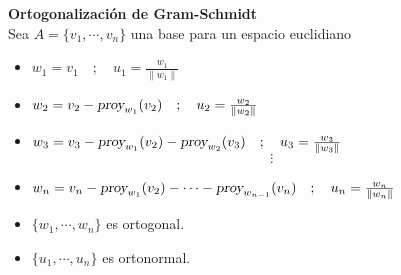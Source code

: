 \begin{defi}\textbf{Ortogonalización de Gram-Schmidt}
    \\
    Sea $A = \{ {v}_{1}, \cdots , {v}_{n} \}$ una base para un espacio euclidiano
    \begin{itemize}
        \item ${w}_{1} = {v}_{1} \quad ; \quad {u}_{1} = \frac{{w}_{1}}{\|{w}_{1} \|}$
        \item ${w}_{2} = {v}_{2} - {\textsl{proy}}_{{w}_{1}}({v}_{2}) \quad ; \quad {u}_{2} = \frac{{w}_{2}}{\|{w}_{2} \|}$
        \item ${w}_{3} = {v}_{3} - {\textsl{proy}}_{{w}_{1}}({v}_{2}) - {\textsl{proy}}_{{w}_{2}}({v}_{3}) \quad ; \quad {u}_{3} = \frac{{w}_{3}}{\|{w}_{3} \|}$
        $$
        \vdots 
        $$
        \item ${w}_{n} = {v}_{n} - {\textsl{proy}}_{{w}_{1}}({v}_{2}) - \cdots - {\textsl{proy}}_{{w}_{n-1}}({v}_{n}) \quad ; \quad {u}_{n} = \frac{{w}_{n}}{\|{w}_{n} \|}$
        \item $\{ {w}_{1}, \cdots , {w}_{n} \}$ es ortogonal.
        \item $\{ {u}_{1}, \cdots , {u}_{n} \}$ es ortonormal.
    \end{itemize}
\end{defi}

